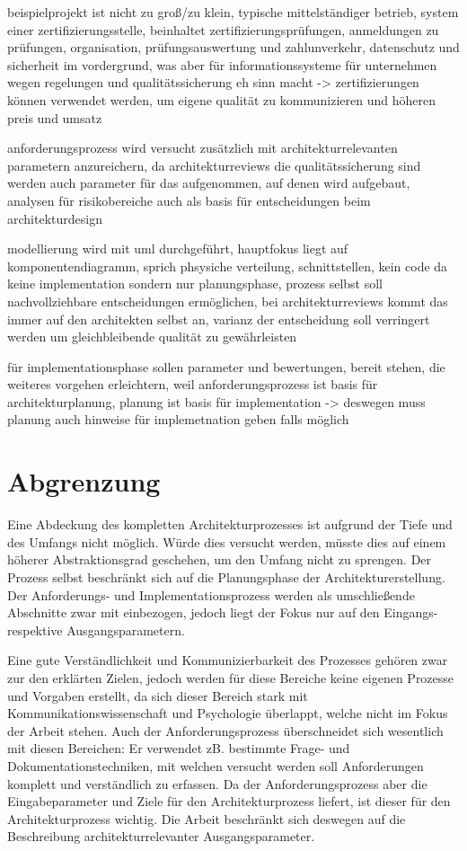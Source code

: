 beispielprojekt ist nicht zu groß/zu klein, typische mittelständiger betrieb, system einer zertifizierungsstelle, beinhaltet zertifizierungsprüfungen, anmeldungen zu prüfungen, organisation, prüfungsauswertung und zahlunverkehr, datenschutz und sicherheit im vordergrund, was aber für informationssysteme für unternehmen wegen regelungen und qualitätssicherung eh sinn macht -> zertifizierungen können verwendet werden, um eigene qualität zu kommunizieren und höheren preis und umsatz

anforderungsprozess wird versucht zusätzlich mit architekturrelevanten parametern anzureichern, da architekturreviews die qualitätssicherung sind werden auch parameter für das aufgenommen, auf denen wird aufgebaut, analysen für risikobereiche auch als basis für entscheidungen beim architekturdesign

modellierung wird mit uml durchgeführt, hauptfokus liegt auf komponentendiagramm, sprich phsysiche verteilung, schnittstellen, kein code da keine implementation sondern nur planungsphase, prozess selbst soll nachvollziehbare entscheidungen ermöglichen, bei architekturreviews kommt das immer auf den architekten selbst an, varianz der entscheidung soll verringert werden um gleichbleibende qualität zu gewährleisten

für implementationsphase sollen parameter und bewertungen, bereit stehen, die weiteres vorgehen erleichtern, weil anforderungsprozess ist basis für architekturplanung, planung ist basis für implementation -> deswegen muss planung auch hinweise für implemetnation geben falls möglich

\section{Abgrenzung}
Eine Abdeckung des kompletten Architekturprozesses ist aufgrund der Tiefe und des Umfangs nicht möglich. Würde dies versucht werden, müsste dies auf einem  höherer Abstraktionsgrad geschehen, um den Umfang nicht zu sprengen. Der Prozess selbst beschränkt sich auf die Planungsphase der Architekturerstellung. Der Anforderungs- und Implementationsprozess werden als umschließende Abschnitte zwar mit einbezogen, jedoch liegt der Fokus nur auf den Eingangs- respektive Ausgangsparametern.

Eine gute Verständlichkeit und Kommunizierbarkeit des Prozesses gehören zwar zur den erklärten Zielen, jedoch werden für diese Bereiche keine eigenen Prozesse und Vorgaben erstellt, da sich dieser Bereich stark mit Kommunikationswissenschaft und Psychologie überlappt, welche nicht im Fokus der Arbeit stehen. Auch der Anforderungsprozess überschneidet sich wesentlich mit diesen Bereichen: Er verwendet zB. bestimmte Frage- und Dokumentationstechniken, mit welchen versucht werden soll Anforderungen komplett und verständlich zu erfassen. Da der Anforderungsprozess aber die Eingabeparameter und Ziele für den Architekturprozess liefert, ist dieser für den Architekturprozess wichtig. Die Arbeit beschränkt sich deswegen auf die Beschreibung architekturrelevanter Ausgangsparameter.

